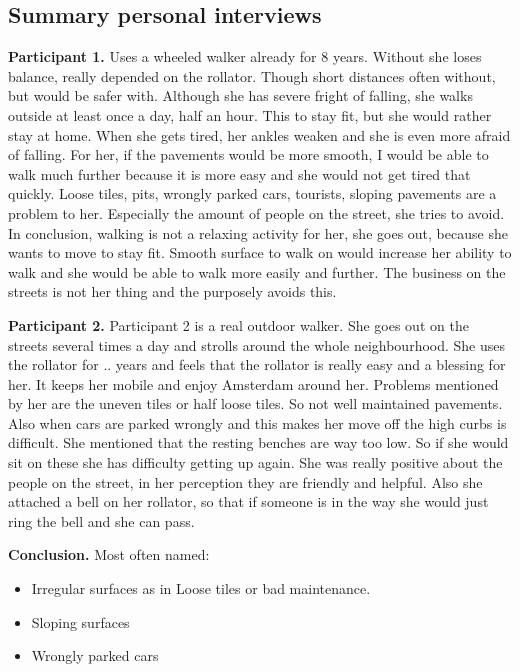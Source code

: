 



\clearpage

\subsection{Summary personal interviews}

\textbf{Participant 1.}
Uses a wheeled walker already for 8 years. Without she loses balance, really depended on the rollator. Though short distances often without, but would be safer with. Although she has severe fright of falling, she walks outside at least once a day, half an hour. This to stay fit, but she would rather stay at home. When she gets tired, her ankles weaken and she is even more afraid of falling. 
For her, if the pavements would be more smooth, I would be able to walk much further because it is more easy and she would not get tired that quickly. Loose tiles, pits, wrongly parked cars, tourists, sloping pavements are a problem to her. Especially the amount of people on the street, she tries to avoid. 
In conclusion, walking is not a relaxing activity for her, she goes out, because she wants to move to stay fit. Smooth surface to walk on would increase her ability to walk and she would be able to walk more easily and further. The business on the streets is not her thing and the purposely avoids this. 

\textbf{Participant 2. }
Participant 2 is a real outdoor walker. She goes out on the streets several times a day and strolls around the whole neighbourhood. She uses the rollator for .. years and feels that the rollator is really easy and a blessing for her. It keeps her mobile and enjoy Amsterdam around her. 
Problems mentioned by her are the uneven tiles or half loose tiles. So not well maintained pavements. Also when cars are parked wrongly and this makes her move off the high curbs is difficult. 
She mentioned that the resting benches are way too low. So if she would sit on these she has difficulty getting up again. 
She was really positive about the people on the street, in her perception they are friendly and helpful. Also she attached a bell on her rollator, so that if someone is in the way she would just ring the bell and she can pass. 

\textbf{Conclusion.} Most often named: 
\begin{itemize}
\item Irregular surfaces as in Loose tiles or bad maintenance. 
\item Sloping surfaces
\item Wrongly parked cars
\end{itemize}



